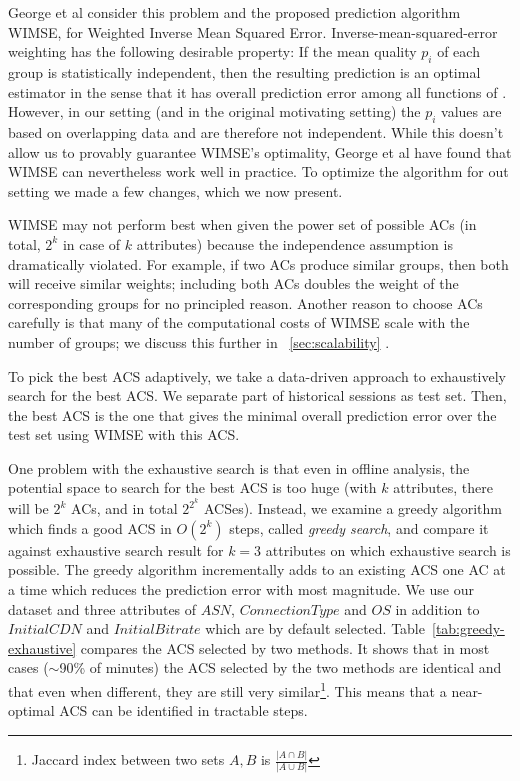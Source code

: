 George et al \cite{george2008value} consider this problem and the proposed prediction algorithm WIMSE, for Weighted Inverse Mean Squared Error.  Inverse-mean-squared-error weighting has the following desirable property: If the mean quality $p_i$ of each group is statistically independent, then the resulting prediction is an optimal estimator in the sense that it has overall prediction error among all functions of \cite{Henry, what is this?}.  However, in our setting (and in the original motivating setting) the $p_i$ values are based on overlapping data and are therefore not independent.  
While this doesn't allow us to provably guarantee WIMSE's optimality, George et al have found that WIMSE can nevertheless work well in practice.  To optimize the algorithm for out setting we made a few changes, which we now present. 



\label{subsec:acs}
WIMSE may not perform best when given the power set of possible ACs (in total, $2^k$ in case of $k$ attributes) because the independence assumption is dramatically violated.  For example, if two ACs produce similar groups, then both will receive similar weights; including both ACs doubles the weight of the corresponding groups for no principled reason. 
 Another reason to choose ACs carefully is that many of the computational costs of WIMSE scale with the number of groups; we discuss this further in \Section~\ref{sec:scalability} .

To pick the best ACS adaptively, we take a data-driven approach to exhaustively search for the best ACS.  We separate part of historical sessions as test set. Then, the best ACS is the one that gives the minimal overall prediction error over the test set using WIMSE with this ACS.

 One problem with the exhaustive search is that even in offline analysis, the potential space to search for the best ACS is too huge (with $k$ attributes, there will be $2^k$ ACs, and in total $2^{2^k}$ ACSes). Instead, we examine a greedy algorithm which finds a good ACS in $O(2^k)$ steps, called {\it greedy search}, and compare it against exhaustive search result for $k=3$ attributes on which exhaustive search is possible. The greedy algorithm incrementally adds to an existing ACS one AC at a time which reduces the prediction error with most magnitude.
We use our dataset and three attributes of $ASN$, $ConnectionType$ and $OS$ in addition to $Initial CDN$ and $Initial Bitrate$ which are by default selected.
Table~\ref{tab:greedy-exhaustive} compares the ACS selected by two methods. It shows that in most cases ($\sim$90\% of minutes) the ACS selected by the two methods are identical and that even when different, they are still very similar\footnote{Jaccard index between two sets $A,B$ is $\frac{|A\cap B|}{|A\cup B|}$}. This means that a near-optimal ACS can be identified in tractable steps.

